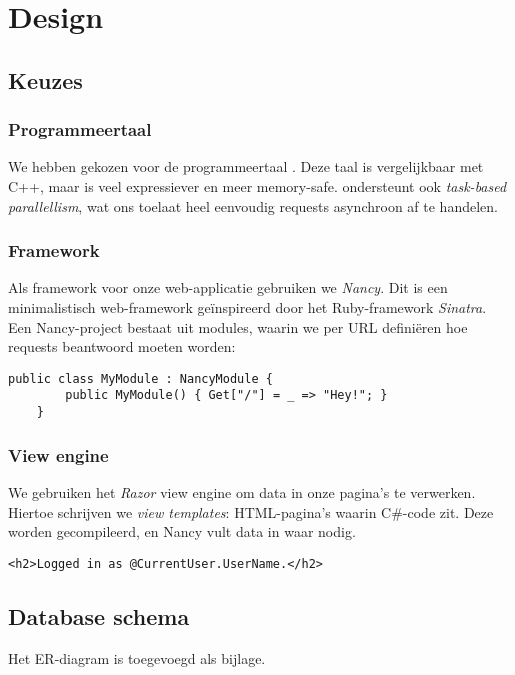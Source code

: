 \documentclass[12pt,a4paper]{article}
\begin{document}
\section{Design}

\subsection{Keuzes}
\subsubsection{Programmeertaal}
We hebben gekozen voor de programmeertaal \CS{}. Deze taal is vergelijkbaar met
C++, maar is veel expressiever en meer memory-safe. \CS{} ondersteunt ook 
\textit{task-based parallellism}, wat ons toelaat heel eenvoudig requests 
asynchroon af te handelen.

\subsubsection{Framework}
Als framework voor onze web-applicatie gebruiken we \textit{Nancy}. Dit is een 
minimalistisch web-framework ge\"inspireerd door het Ruby-framework 
\textit{Sinatra}. Een Nancy-project bestaat uit modules, waarin we per URL 
defini\"eren hoe requests beantwoord moeten worden:

\begin{lstlisting}[caption=Een \textit{hello world}-applicatie in Nancy]
    public class MyModule : NancyModule {
        public MyModule() { Get["/"] = _ => "Hey!"; }
    }
\end{lstlisting}

\subsubsection{View engine}
We gebruiken het \textit{Razor} view engine om data in onze pagina's te 
verwerken. Hiertoe schrijven we \textit{view templates}: HTML-pagina's waarin 
C\#-code zit. Deze worden gecompileerd, en Nancy vult data in waar nodig.

\lstset{language=HTML}
\begin{lstlisting}[caption=Een simpel voorbeeld van een Razor view, label=razor]
    <h2>Logged in as @CurrentUser.UserName.</h2>
\end{lstlisting}

\subsection{Database schema}
Het ER-diagram is toegevoegd als bijlage.
\end{document}
